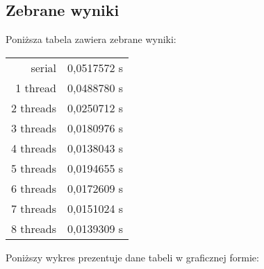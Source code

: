 \documentclass[12pt]{article}
\begin{document}
		\subsection{Zebrane wyniki}	
				Poniższa tabela zawiera zebrane wyniki: \newline
		\begin{tabular}{|r|l|} \hline
			serial		&	0,0517572 s \\
			1 thread	&	0,0488780 s \\
			2 threads	&	0,0250712 s \\
			3 threads	&	0,0180976 s \\
			4 threads	&	0,0138043 s \\
			5 threads	&	0,0194655 s \\
			6 threads	&	0,0172609 s \\
			7 threads	&	0,0151024 s \\
			8 threads	&	0,0139309 s \\
			\hline
		\end{tabular}\newline 
		
		Poniższy wykres prezentuje dane tabeli w graficznej formie:	\newline
		\begin{bchart}[step=0.03, max=0.06, unit=s]
		\end{bchart}	
\end{document}
